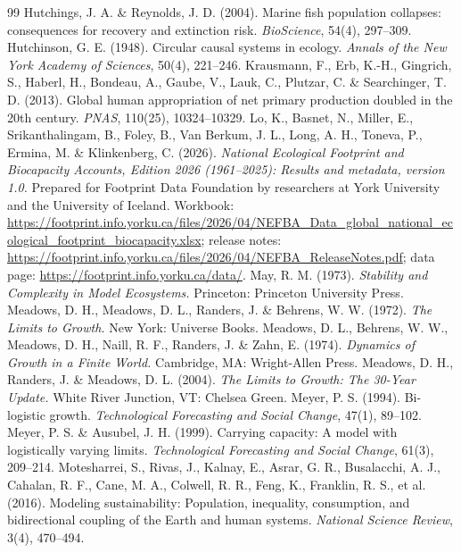 \begin{thebibliography}{99}
 Hutchings, J. A. \& Reynolds, J. D. (2004). Marine fish population collapses: consequences for recovery and extinction risk. \emph{BioScience}, 54(4), 297--309.
 Hutchinson, G. E. (1948). Circular causal systems in ecology. \emph{Annals of the New York Academy of Sciences}, 50(4), 221--246.
 Krausmann, F., Erb, K.-H., Gingrich, S., Haberl, H., Bondeau, A., Gaube, V., Lauk, C., Plutzar, C. \& Searchinger, T. D. (2013). Global human appropriation of net primary production doubled in the 20th century. \emph{PNAS}, 110(25), 10324--10329.
 Lo, K., Basnet, N., Miller, E., Srikanthalingam, B., Foley, B., Van Berkum, J. L., Long, A. H., Toneva, P., Ermina, M. \& Klinkenberg, C. (2026). \emph{National Ecological Footprint and Biocapacity Accounts, Edition 2026 (1961--2025): Results and metadata, version 1.0.} Prepared for Footprint Data Foundation by researchers at York University and the University of Iceland. Workbook: \url{https://footprint.info.yorku.ca/files/2026/04/NEFBA_Data_global_national_ecological_footprint_biocapacity.xlsx}; release notes: \url{https://footprint.info.yorku.ca/files/2026/04/NEFBA_ReleaseNotes.pdf}; data page: \url{https://footprint.info.yorku.ca/data/}.
 May, R. M. (1973). \emph{Stability and Complexity in Model Ecosystems.} Princeton: Princeton University Press.
 Meadows, D. H., Meadows, D. L., Randers, J. \& Behrens, W. W. (1972). \emph{The Limits to Growth.} New York: Universe Books.
 Meadows, D. L., Behrens, W. W., Meadows, D. H., Naill, R. F., Randers, J. \& Zahn, E. (1974). \emph{Dynamics of Growth in a Finite World.} Cambridge, MA: Wright-Allen Press.
 Meadows, D. H., Randers, J. \& Meadows, D. L. (2004). \emph{The Limits to Growth: The 30-Year Update.} White River Junction, VT: Chelsea Green.
 Meyer, P. S. (1994). Bi-logistic growth. \emph{Technological Forecasting and Social Change}, 47(1), 89--102.
 Meyer, P. S. \& Ausubel, J. H. (1999). Carrying capacity: A model with logistically varying limits. \emph{Technological Forecasting and Social Change}, 61(3), 209--214.
 Motesharrei, S., Rivas, J., Kalnay, E., Asrar, G. R., Busalacchi, A. J., Cahalan, R. F., Cane, M. A., Colwell, R. R., Feng, K., Franklin, R. S., et al. (2016). Modeling sustainability: Population, inequality, consumption, and bidirectional coupling of the Earth and human systems. \emph{National Science Review}, 3(4), 470--494.

\end{thebibliography}
